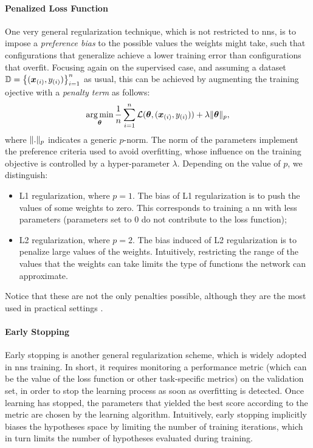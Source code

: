 \paragraph{Penalized Loss Function}
One very general regularization technique, which is not restricted to \glspl{nn}, is to impose a \emph{preference bias} to the possible values the weights might take, such that configurations that generalize achieve a lower training error than configurations that overfit. Focusing again on the supervised case, and assuming a dataset $\Data = \Set{(\PatternVector{x}{i}, \Pattern{y}{i})}_{i=1}^n$ as usual, this can be achieved by augmenting the training ojective with a \emph{penalty term} as follows:
$$\argmin_{\Param} \frac{1}{n} \sum_{i=1}^n \Loss(\Param, (\PatternVector{x}{i}, \Pattern{y}{i})) + \lambda\norm{\Param}_p,$$
where $\mathopen\| . \mathclose\|_p$ indicates a generic $p$-norm. The norm of the parameters implement the preference criteria used to avoid overfitting, whose influence on the training objective is controlled by a hyper-parameter $\lambda$. Depending on the value of $p$, we distinguish:
\begin{itemize}
    \item L1 regularization, where $p=1$. The bias of L1 regularization is to push the values of some weights to zero. This corresponds to training a \gls{nn} with less parameters (parameters set to 0 do not contribute to the loss function);
    \item L2 regularization, where $p=2$. The bias induced of L2 regularization is to penalize large values of the weights. Intuitively, restricting the range of the values that the weights can take limits the type of functions the network can approximate.
\end{itemize}
Notice that these are not the only penalties possible, although they are the most used in practical settings \citep{hastie2009elements}.

\paragraph{Early Stopping}
Early stopping \citep{prechelt1998earlystopping} is another general regularization scheme, which is widely adopted in \glspl{nn} training. In short, it requires monitoring a performance metric (which can be the value of the loss function or other task-specific metrics) on the validation set, in order to stop the learning process as soon as overfitting is detected. Once learning has stopped, the parameters that yielded the best score according to the metric are chosen by the learning algorithm. Intuitively, early stopping implicitly biases the hypotheses space by limiting the number of training iterations, which in turn limits the number of hypotheses evaluated during training.

